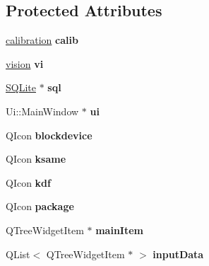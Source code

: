 \subsection*{Protected Attributes}
\begin{DoxyCompactItemize}
\item 
\hyperlink{classcalibration}{calibration} {\bfseries calib}\hypertarget{classMainWindow_af0f15ce63e7c003a7eb12f88472ac675}{}\label{classMainWindow_af0f15ce63e7c003a7eb12f88472ac675}

\item 
\hyperlink{classvision}{vision} {\bfseries vi}\hypertarget{classMainWindow_a102393c36ab2af8821bbb60d0726f7d0}{}\label{classMainWindow_a102393c36ab2af8821bbb60d0726f7d0}

\item 
\hyperlink{classSQLite}{S\+Q\+Lite} $\ast$ {\bfseries sql}\hypertarget{classMainWindow_a27a47dcf3589dd010ce7803cb3b2ff85}{}\label{classMainWindow_a27a47dcf3589dd010ce7803cb3b2ff85}

\item 
Ui\+::\+Main\+Window $\ast$ {\bfseries ui}\hypertarget{classMainWindow_a35466a70ed47252a0191168126a352a5}{}\label{classMainWindow_a35466a70ed47252a0191168126a352a5}

\item 
Q\+Icon {\bfseries blockdevice}\hypertarget{classMainWindow_add3756176df4e7230246c550d9b6e2db}{}\label{classMainWindow_add3756176df4e7230246c550d9b6e2db}

\item 
Q\+Icon {\bfseries ksame}\hypertarget{classMainWindow_ac1beb6db1d37a2a6c3d66688aefd9a66}{}\label{classMainWindow_ac1beb6db1d37a2a6c3d66688aefd9a66}

\item 
Q\+Icon {\bfseries kdf}\hypertarget{classMainWindow_a9d4567d65912ab7578d00827129c4755}{}\label{classMainWindow_a9d4567d65912ab7578d00827129c4755}

\item 
Q\+Icon {\bfseries package}\hypertarget{classMainWindow_a211b3162d03a5c229ac006150286429e}{}\label{classMainWindow_a211b3162d03a5c229ac006150286429e}

\item 
Q\+Tree\+Widget\+Item $\ast$ {\bfseries main\+Item}\hypertarget{classMainWindow_a4a0290f0cbe44f14933b0903728d420c}{}\label{classMainWindow_a4a0290f0cbe44f14933b0903728d420c}

\item 
Q\+List$<$ Q\+Tree\+Widget\+Item $\ast$ $>$ {\bfseries input\+Data}\hypertarget{classMainWindow_ab00172798ad65e4b60d1e14bc681a50d}{}\label{classMainWindow_ab00172798ad65e4b60d1e14bc681a50d}


\end{DoxyCompactItemize}
